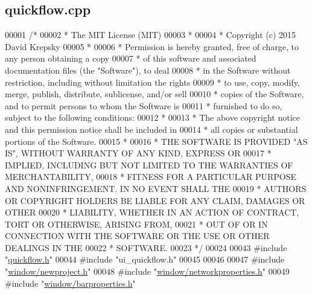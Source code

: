 \hypertarget{quickflow_8cpp_source}{}\subsection{quickflow.\+cpp}
\label{quickflow_8cpp_source}

\begin{DoxyCode}
00001 \textcolor{comment}{/*}
00002 \textcolor{comment}{ * The MIT License (MIT)}
00003 \textcolor{comment}{ *}
00004 \textcolor{comment}{ * Copyright (c) 2015 David Krepsky}
00005 \textcolor{comment}{ *}
00006 \textcolor{comment}{ * Permission is hereby granted, free of charge, to any person obtaining a copy}
00007 \textcolor{comment}{ * of this software and associated documentation files (the "Software"), to deal}
00008 \textcolor{comment}{ * in the Software without restriction, including without limitation the rights}
00009 \textcolor{comment}{ * to use, copy, modify, merge, publish, distribute, sublicense, and/or sell}
00010 \textcolor{comment}{ * copies of the Software, and to permit persons to whom the Software is}
00011 \textcolor{comment}{ * furnished to do so, subject to the following conditions:}
00012 \textcolor{comment}{ *}
00013 \textcolor{comment}{ * The above copyright notice and this permission notice shall be included in}
00014 \textcolor{comment}{ * all copies or substantial portions of the Software.}
00015 \textcolor{comment}{ *}
00016 \textcolor{comment}{ * THE SOFTWARE IS PROVIDED "AS IS", WITHOUT WARRANTY OF ANY KIND, EXPRESS OR}
00017 \textcolor{comment}{ * IMPLIED, INCLUDING BUT NOT LIMITED TO THE WARRANTIES OF MERCHANTABILITY,}
00018 \textcolor{comment}{ * FITNESS FOR A PARTICULAR PURPOSE AND NONINFRINGEMENT. IN NO EVENT SHALL THE}
00019 \textcolor{comment}{ * AUTHORS OR COPYRIGHT HOLDERS BE LIABLE FOR ANY CLAIM, DAMAGES OR OTHER}
00020 \textcolor{comment}{ * LIABILITY, WHETHER IN AN ACTION OF CONTRACT, TORT OR OTHERWISE, ARISING FROM,}
00021 \textcolor{comment}{ * OUT OF OR IN CONNECTION WITH THE SOFTWARE OR THE USE OR OTHER DEALINGS IN THE}
00022 \textcolor{comment}{ * SOFTWARE.}
00023 \textcolor{comment}{ */}
00024 
00043 \textcolor{preprocessor}{#include "\hyperlink{quickflow_8h}{quickflow.h}"}
00044 \textcolor{preprocessor}{#include "ui\_quickflow.h"}
00045 
00046 
00047 \textcolor{preprocessor}{#include "\hyperlink{newproject_8h}{window/newproject.h}"}
00048 \textcolor{preprocessor}{#include "\hyperlink{networkproperties_8h}{window/networkproperties.h}"}
00049 \textcolor{preprocessor}{#include "\hyperlink{barproperties_8h}{window/barproperties.h}"}

\end{DoxyCode}
